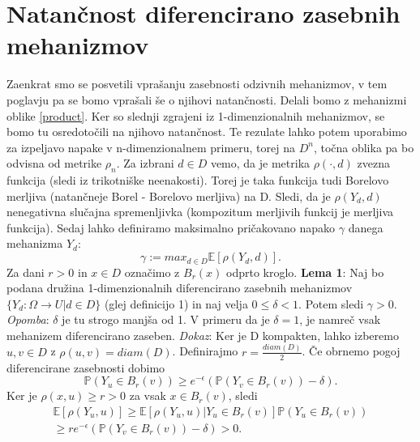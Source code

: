 \documentclass[mat1]{article}
\theoremstyle{definition}
\begin{document}
\section{Natančnost diferencirano zasebnih mehanizmov}
Zaenkrat smo se posvetili vprašanju zasebnosti odzivnih mehanizmov, v tem poglavju pa se bomo vprašali še o njihovi natančnosti. Delali bomo z mehanizmi oblike \eqref{product}. Ker so slednji zgrajeni iz 1-dimenzionalnih mehanizmov, se bomo tu osredotočili na njihovo natančnost. Te rezulate lahko potem uporabimo za izpeljavo napake v n-dimenzionalnem primeru, torej na $D^n$, točna oblika pa bo odvisna od metrike $\rho_n$.
\newline
\newline
Za izbrani $d \in D$ vemo, da je metrika $\rho( \cdot , d)$ zvezna funkcija (sledi iz trikotniške neenakosti). Torej je taka funkcija tudi Borelovo merljiva (natančneje Borel - Borelovo merljiva) na D.  Sledi, da je $\rho(Y_d,d)$ nenegativna slučajna spremenljivka (kompozitum merljivih funkcij je merljiva funkcija). Sedaj lahko definiramo maksimalno pričakovano napako $\gamma$ danega mehanizma $Y_d$: $$\gamma := max_{d\in D}\mathbb{E}[\rho(Y_d,d)].$$ Za dani $r > 0$ in $x \in D$ označimo z $B_r(x)$ odprto kroglo. 
\newline
\newline
\textbf{Lema 1}: Naj bo podana družina 1-dimenzionalnih diferencirano zasebnih mehanizmov $\{ Y_d: \Omega \rightarrow U | d \in D\}$ (glej definicijo 1) in naj velja $0 \leq \delta < 1$. Potem sledi $\gamma > 0$.
\newline
\newline
\textit{Opomba}: $\delta$ je tu strogo manjša od 1. V primeru da je $\delta = 1$, je namreč vsak mehanizem diferencirano zaseben.
\newline
\newline
\textit{Dokaz}: Ker je D kompakten, lahko izberemo $u,v \in D$ z $\rho(u,v)=diam(D)$. Definirajmo $r=\frac{diam(D)}{2}$. Če obrnemo pogoj diferencirane zasebnosti dobimo $$\mathbb{P}(Y_u \in B_r(v)) \geq e^{-\epsilon}(\mathbb{P}(Y_v \in B_r(v)) -\delta).$$ Ker je $\rho(x,u) \geq r > 0$ za vsak $x \in B_r(v)$, sledi 
\begin{equation*}
\begin{split}
\mathbb{E}[\rho(Y_u,u)] \geq \mathbb{E}[\rho(Y_u,u) | Y_u \in B_r(v)] \mathbb{P}(Y_u \in B_r(v)) \\
\geq r e^{-\epsilon}(\mathbb{P}(Y_v \in B_r(v)) -\delta) > 0.
\end{split}
\end{equation*}
\end{document}
